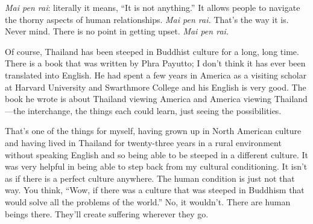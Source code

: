 \emph{Mai pen rai}: literally it means, “It is not anything.” It allows
people to navigate the thorny aspects of human relationships. \emph{Mai
pen rai.} That’s the way it is. Never mind. There is no point in getting
upset. \emph{Mai pen rai.}

Of course, Thailand has been steeped in Buddhist culture for a long,
long time. There is a book that was written by Phra Payutto; I don’t
think it has ever been translated into English. He had spent a few years
in America as a visiting scholar at Harvard University and Swarthmore
College and his English is very good. The book he wrote is about
Thailand viewing America and America viewing Thailand—the interchange,
the things each could learn, just seeing the possibilities.

That’s one of the things for myself, having grown up in North American
culture and having lived in Thailand for twenty-three years in a rural
environment without speaking English and so being able to be steeped in
a different culture. It was very helpful in being able to step back from
my cultural conditioning. It isn’t as if there is a perfect culture
anywhere. The human condition is just not that way. You think, “Wow, if
there was a culture that was steeped in Buddhism that would solve all
the problems of the world.” No, it wouldn’t. There are human beings
there. They’ll create suffering wherever they go.
